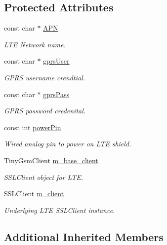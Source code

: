 \subsection*{Protected Attributes}
\begin{DoxyCompactItemize}
\item 
const char $\ast$ \hyperlink{class_loom___l_t_e_a186a401a887e8fe3d7fdea20ad460647}{A\+PN}
\begin{DoxyCompactList}\small\item\em L\+TE Network name. \end{DoxyCompactList}\item 
const char $\ast$ \hyperlink{class_loom___l_t_e_aea1ba6a0a9f7ed65081b769f53d683ad}{gprs\+User}
\begin{DoxyCompactList}\small\item\em G\+P\+RS username crendtial. \end{DoxyCompactList}\item 
const char $\ast$ \hyperlink{class_loom___l_t_e_a30c8118155a3c520b09cc6f4cc3e5281}{gprs\+Pass}
\begin{DoxyCompactList}\small\item\em G\+P\+RS password credenital. \end{DoxyCompactList}\item 
const int \hyperlink{class_loom___l_t_e_a2957c4ed2f16b6e5d5efcf26a54ab6f1}{power\+Pin}
\begin{DoxyCompactList}\small\item\em Wired analog pin to power on L\+TE shield. \end{DoxyCompactList}\item 
Tiny\+Gsm\+Client \hyperlink{class_loom___l_t_e_a4413f26e14ac858125124311856a3a04}{m\+\_\+base\+\_\+client}
\begin{DoxyCompactList}\small\item\em S\+S\+L\+Client object for L\+TE. \end{DoxyCompactList}\item 
S\+S\+L\+Client \hyperlink{class_loom___l_t_e_a58e7db415a377eae5363ad7e740b4dfb}{m\+\_\+client}
\begin{DoxyCompactList}\small\item\em Underlying L\+TE S\+S\+L\+Client instance. \end{DoxyCompactList}\end{DoxyCompactItemize}
\subsection*{Additional Inherited Members}


